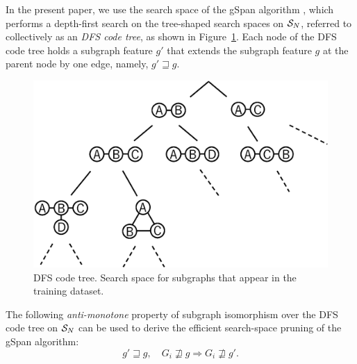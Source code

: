 In the present paper, we use the search space of the gSpan algorithm \cite{Yan:2002},
which performs a depth-first search on the tree-shaped search spaces on $\S_N$,
referred to collectively as an \textit{DFS code tree}, as shown in Figure~\ref{fig:search_tree}.
Each node of the DFS code tree holds a subgraph feature $g'$ that
extends the subgraph feature $g$ at the parent node by one edge, namely, $ g' \sqsupseteq g $.

\begin{figure}[t]
  \centering
  \includegraphics[width=0.5\linewidth]{img/search_tree.eps}
  \caption{DFS code tree. Search space for subgraphs that appear in the training dataset.}
  \label{fig:search_tree}
\end{figure}

The following \textit{anti-monotone} property of
subgraph isomorphism over the DFS code tree on $\S_N$ can be used to
derive the efficient search-space pruning of the gSpan algorithm:
\begin{equation}
  \label{eq:propSubgraph}
  g' \sqsupseteq g, \quad 
  G_i \not \sqsupseteq g \Rightarrow G_i \not\sqsupseteq g'. %
\end{equation}

